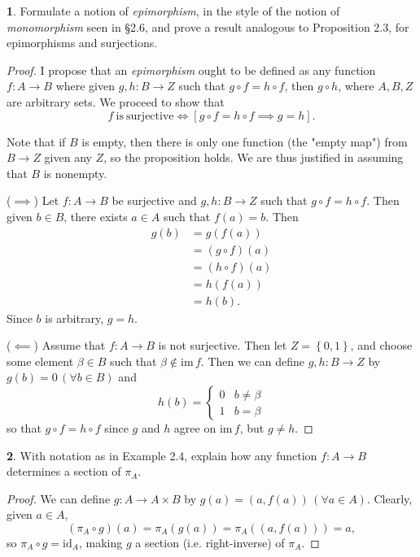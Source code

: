 \documentclass{article}
\newcounter{section-number}
\theoremstyle{definition}
\newtheorem{ex}{}[section-number]
\begin{document}
\begin{ex}
	Formulate a notion of \textit{epimorphism}, in the style of the notion of \textit{monomorphism} seen in \S 2.6, and prove a result analogous to Proposition 2.3, for epimorphisms and surjections.
\end{ex}
\begin{proof}
	I propose that an \textit{epimorphism} ought to be defined as any function $f: A \to B$ where given $g, h: B \to Z$ such that $g \circ f = h \circ f$, then $g \circ h$, where $A, B, Z$ are arbitrary sets.
	We proceed to show that \begin{equation*}
		f\ \mathrm{is\ surjective} \iff \left\lbrack g \circ f = h \circ f \implies g = h \right\rbrack.
	\end{equation*}

	Note that if $B$ is empty, then there is only one function (the "empty map") from $B \to Z$ given any $Z$, so the proposition holds.
	We are thus justified in assuming that $B$ is nonempty.

	($\implies$) Let $f: A \to B$ be surjective and $g, h: B \to Z$ such that $g \circ f = h \circ f$.
	Then given $b \in B$, there exists $a \in A$ such that $f(a) = b$.
	Then \begin{align*}
		g(b) & = g(f(a))        \\
		     & = (g \circ f)(a) \\
		     & = (h \circ f)(a) \\
		     & = h(f(a))        \\
		     & = h(b).
	\end{align*}
	Since $b$ is arbitrary, $g = h$.

	($\impliedby$) Assume that $f: A \to B$ is not surjective.
	Then let $Z = \left\lbrace 0, 1 \right\rbrace$, and choose some element $\beta \in B$ such that $\beta \notin \mathrm{im}\,f$.
	Then we can define $g, h: B \to Z$ by $g(b) = 0\,(\forall b \in B)$ and \begin{equation*}
		h(b) = \begin{cases}
			0 & b \neq \beta \\
			1 & b = \beta
		\end{cases}
	\end{equation*}
	so that $g \circ f = h \circ f$ since $g$ and $h$ agree on $\mathrm{im}\,f$, but $g \neq h$.
\end{proof}

\begin{ex}
	With notation as in Example 2.4, explain how any function $f: A \to B$ determines a section of $\pi_A$.
\end{ex}
\begin{proof}
	We can define $g: A \to A \times B$ by $g(a) = (a, f(a))\,(\forall a \in A)$.
	Clearly, given $a \in A$, \begin{equation*}
		(\pi_A \circ g)(a) = \pi_A(g(a)) = \pi_A((a, f(a))) = a,
	\end{equation*}
	so $\pi_A \circ g = \mathrm{id}_A$, making $g$ a section (i.e. right-inverse) of $\pi_A$.
\end{proof}
\end{document}
